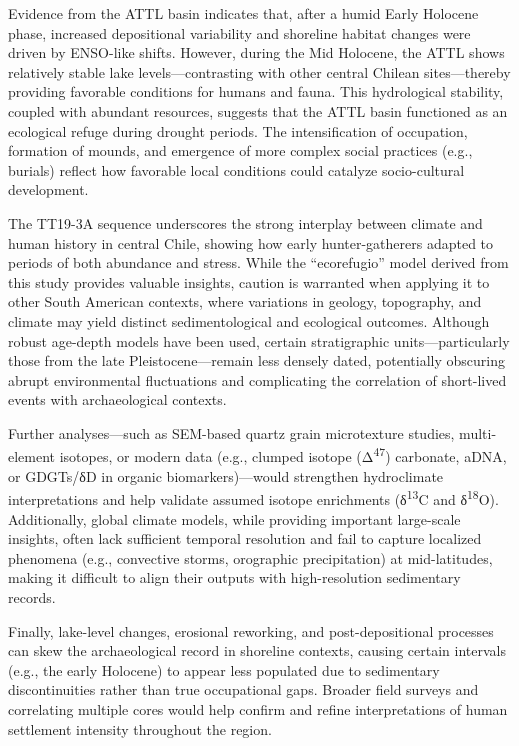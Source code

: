 \documentclass[
]{article}
\begin{document}
Evidence from the ATTL basin indicates that, after a humid Early
Holocene phase, increased depositional variability and shoreline habitat
changes were driven by ENSO-like shifts. However, during the Mid
Holocene, the ATTL shows relatively stable lake levels---contrasting
with other central Chilean sites---thereby providing favorable
conditions for humans and fauna. This hydrological stability, coupled
with abundant resources, suggests that the ATTL basin functioned as an
ecological refuge during drought periods. The intensification of
occupation, formation of mounds, and emergence of more complex social
practices (e.g., burials) reflect how favorable local conditions could
catalyze socio-cultural development.

The TT19-3A sequence underscores the strong interplay between climate
and human history in central Chile, showing how early hunter-gatherers
adapted to periods of both abundance and stress. While the
``ecorefugio'' model derived from this study provides valuable insights,
caution is warranted when applying it to other South American contexts,
where variations in geology, topography, and climate may yield distinct
sedimentological and ecological outcomes. Although robust age-depth
models have been used, certain stratigraphic units---particularly those
from the late Pleistocene---remain less densely dated, potentially
obscuring abrupt environmental fluctuations and complicating the
correlation of short-lived events with archaeological contexts.

Further analyses---such as SEM-based quartz grain microtexture studies,
multi-element isotopes, or modern data (e.g., clumped isotope
(Δ\textsuperscript{47}) carbonate, aDNA, or GDGTs/δD in organic
biomarkers)---would strengthen hydroclimate interpretations and help
validate assumed isotope enrichments (δ\textsuperscript{13}C and
δ\textsuperscript{18}O). Additionally, global climate models, while
providing important large-scale insights, often lack sufficient temporal
resolution and fail to capture localized phenomena (e.g., convective
storms, orographic precipitation) at mid-latitudes, making it difficult
to align their outputs with high-resolution sedimentary records.

Finally, lake-level changes, erosional reworking, and post-depositional
processes can skew the archaeological record in shoreline contexts,
causing certain intervals (e.g., the early Holocene) to appear less
populated due to sedimentary discontinuities rather than true
occupational gaps. Broader field surveys and correlating multiple cores
would help confirm and refine interpretations of human settlement
intensity throughout the region.
\end{document}
